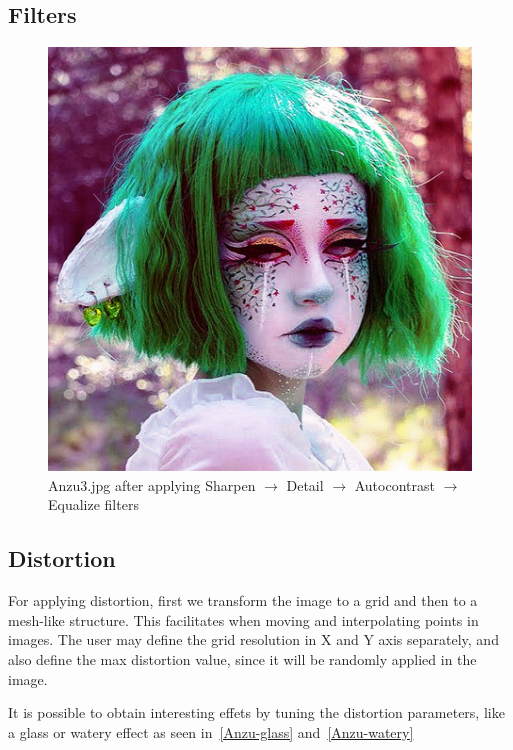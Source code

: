 \documentclass[12pt,a4paper]{article}
\begin{document}
\subsection{Filters}

    \begin{figure}[!ht]
        \centering
        \includegraphics[scale=0.25]{Anzu-test.jpg}
        \caption{Anzu3.jpg after applying Sharpen $\rightarrow$ Detail $\rightarrow$ Autocontrast $\rightarrow$ Equalize filters}
        \label{Anzu-test}
    \end{figure}

\subsection{Distortion}
    For applying distortion, first we transform the image to a grid and then to a mesh-like structure. This facilitates when moving and interpolating points in images. The user may define the grid resolution in X and Y axis separately, and also define the max distortion value, since it will be randomly applied in the image.

    It is possible to obtain interesting effets by tuning the distortion parameters, like a glass or watery effect as seen in~\ref{Anzu-glass} and~\ref{Anzu-watery}
\end{document}
